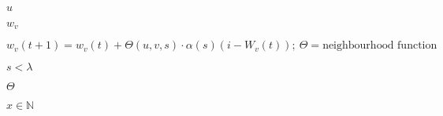 \documentclass[10pt]{book}
\begin{document}
\begin{mdSnippets}
\begin{mdInlineSnippet}[7b774effe4a349c6dd82ad4f4f21d34c]
$u$\end{mdInlineSnippet}%
\begin{mdInlineSnippet}[d690d53f1c3c9670313e51ce35c9b5d0]%
$w_v$\end{mdInlineSnippet}%
\begin{mdInlineSnippet}[25b72824d54192a349079f87fe7c83bf]%
$w_v(t+1) = w_v(t) + \Theta (u, v, s) \cdot \alpha (s) (i - W_v(t)); ~ \Theta = \text{neighbourhood function}$\end{mdInlineSnippet}%
\begin{mdInlineSnippet}[305d9a2ffbf9368c7462367cf02e8f55]%
$s < \lambda$\end{mdInlineSnippet}%
\begin{mdInlineSnippet}[b9dce96eb3d5a71b28f9f198c28d2d1b]%
$\Theta$\end{mdInlineSnippet}%
\begin{mdInlineSnippet}[20af8a90200a48237eb0eb745800dc6b]%
$x \in \mathds{N}$\end{mdInlineSnippet}%

\end{mdSnippets}
\end{document}
